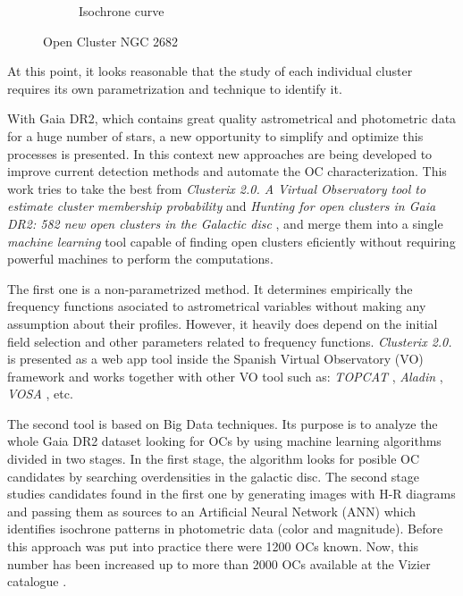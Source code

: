 \documentclass[11pt, a4paper, english]{book}
\begin{document}
\begin{figure}[htbp]
\begin{subfigure}[t]{0.45\textwidth}
    \caption{Isochrone curve}
    \label{fig:parallax_ngc_2682}
  \end{subfigure}
  \caption{Open Cluster NGC 2682}
\end{figure}

At this point, it looks reasonable that the study of each individual cluster requires its own parametrization and technique
to identify it.

With Gaia DR2, which contains great quality astrometrical and photometric data for a huge number of stars,
a new opportunity to simplify and optimize this processes is presented.
In this context new approaches are being developed to improve current detection methods and automate the OC characterization.
This work tries to take the best from \emph{Clusterix 2.0. A Virtual Observatory tool to estimate cluster membership probability}
\cite[]{balaguer2020clusterix} and \emph{Hunting for open clusters in Gaia DR2: 582 new open clusters
in the Galactic disc} \cite[]{castro2020hunting}, and merge them into a single \emph{machine learning}
tool capable of finding open clusters eficiently without requiring powerful machines to perform the computations.

The first one is a non-parametrized method. It determines empirically the frequency functions asociated to astrometrical variables
without making any assumption about their profiles. However, it heavily does depend on the initial field selection and other
parameters related to frequency functions. \emph{Clusterix 2.0.} is presented as a web app tool inside the Spanish Virtual Observatory
(VO) framework and works together with other VO tool such as:
\emph{TOPCAT} \cite[][\url{http://www.starlink.ac.uk/topcat/}]{taylor2005topcat},
\emph{Aladin} \cite[][\url{https://aladin.u-strasbg.fr/aladin.gml}]{bonnarel2000aladin},
\emph{VOSA} \cite[][\url{http://svo2.cab.inta-csic.es/theory/vosa/}]{bayo2008vosa}, etc.

The second tool is based on Big Data techniques. Its purpose is to analyze the whole Gaia DR2 dataset looking for OCs by using
machine learning algorithms divided in two stages. In the first stage, the algorithm looks for posible OC candidates by searching
overdensities in the galactic disc.
The second stage studies candidates found in the first one by generating images with H-R diagrams and passing them
as sources to an Artificial Neural Network (ANN) which identifies isochrone patterns in photometric data (color and magnitude).
Before this approach was put into practice there were 1200 OCs known. Now, this number has been increased up to more than 2000 OCs
available at the Vizier catalogue \cite[][\url{https://vizier.unistra.fr}]{ochsenbein2000vizier}.
\end{document}
